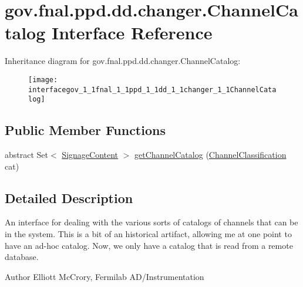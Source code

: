 \hypertarget{interfacegov_1_1fnal_1_1ppd_1_1dd_1_1changer_1_1ChannelCatalog}{\section{gov.\-fnal.\-ppd.\-dd.\-changer.\-Channel\-Catalog Interface Reference}
\label{interfacegov_1_1fnal_1_1ppd_1_1dd_1_1changer_1_1ChannelCatalog}
}
Inheritance diagram for gov.\-fnal.\-ppd.\-dd.\-changer.\-Channel\-Catalog\-:\begin{figure}[H]
\begin{center}
\leavevmode
\texttt{[image: interfacegov\_1\_1fnal\_1\_1ppd\_1\_1dd\_1\_1changer\_1\_1ChannelCatalog]}
\end{center}
\end{figure}
\subsection*{Public Member Functions}
\begin{DoxyCompactItemize}
\item 
abstract Set$<$ \hyperlink{interfacegov_1_1fnal_1_1ppd_1_1dd_1_1signage_1_1SignageContent}{Signage\-Content} $>$ \hyperlink{interfacegov_1_1fnal_1_1ppd_1_1dd_1_1changer_1_1ChannelCatalog_afa94549b979299708605d160be60ca35}{get\-Channel\-Catalog} (\hyperlink{classgov_1_1fnal_1_1ppd_1_1dd_1_1changer_1_1ChannelClassification}{Channel\-Classification} cat)
\end{DoxyCompactItemize}


\subsection{Detailed Description}
An interface for dealing with the various sorts of catalogs of channels that can be in the system. This is a bit of an historical artifact, allowing me at one point to have an ad-\/hoc catalog. Now, we only have a catalog that is read from a remote database.

\begin{DoxyAuthor}{Author}
Elliott Mc\-Crory, Fermilab A\-D/\-Instrumentation 
\end{DoxyAuthor}


